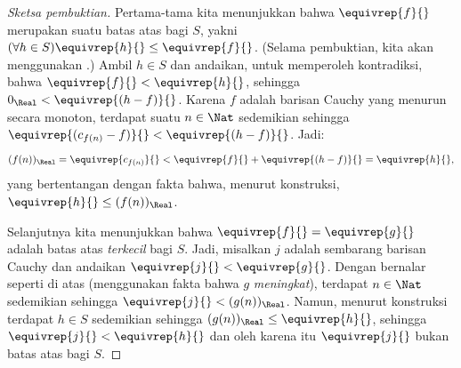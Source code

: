 \documentclass[../../../include/open-logic-section]{subfiles}
\begin{document}
\begin{proof}[Sketsa pembuktian]
Pertama-tama kita menunjukkan bahwa $\equivrep{f}{}$ merupakan suatu batas atas bagi $S$, yakni\ $(\forall h \in S)\equivrep{h}{} \leq \equivrep{f}{}$.
(Selama pembuktian, kita akan menggunakan .) Ambil $h \in S$ dan
andaikan, untuk memperoleh kontradiksi, bahwa $\equivrep{f}{} < \equivrep{h}{}$, sehingga
$0_\Real < \equivrep{(h-f)}{}$. Karena $f$ adalah barisan Cauchy yang menurun
secara monoton, terdapat suatu $n \in \Nat$ sedemikian sehingga
$\equivrep{(c_{f(n)} - f)}{} < \equivrep{(h-f)}{}$. Jadi:
\[
	(f(n))_\Real = \equivrep{c_{f(n)}}{} < \equivrep{f}{} + \equivrep{(h-f)}{} = \equivrep{h}{},
\]
yang bertentangan dengan fakta bahwa, menurut konstruksi, $\equivrep{h}{} \leq (f(n))_\Real$.

Selanjutnya kita menunjukkan bahwa $\equivrep{f}{} = \equivrep{g}{}$ adalah batas atas \emph{terkecil} bagi $S$. Jadi, misalkan $j$ adalah sembarang barisan Cauchy dan andaikan $\equivrep{j}{} < \equivrep{g}{}$. Dengan bernalar seperti di atas (menggunakan fakta bahwa $g$ \emph{meningkat}), terdapat $n \in \Nat$ sedemikian sehingga $\equivrep{j}{} < (g(n))_\Real$. Namun, menurut konstruksi terdapat $h \in S$ sedemikian sehingga $(g(n))_\Real \leq \equivrep{h}{}$, sehingga $\equivrep{j}{} < \equivrep{h}{}$ dan oleh karena itu $\equivrep{j}{}$ bukan batas atas bagi $S$.
\end{proof}
\end{document}
